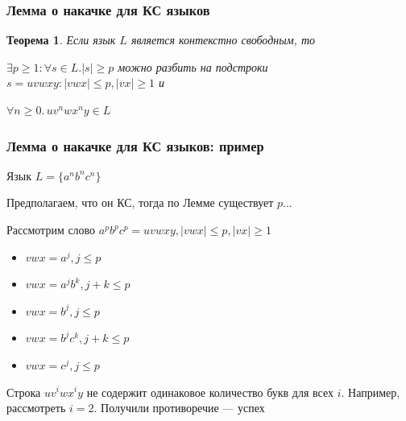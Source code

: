 \documentclass{beamer}
\newtheorem{rutheorem}{Теорема}
\begin{document}
\begin{frame}[fragile]
  \transwipe[direction=90]
  \frametitle{Лемма о накачке для КС языков}
  \begin{rutheorem}
    Если язык $L$ является контекстно свободным, то 
    
    $\exists p \geq 1: \forall s \in L. |s| \geq p $ можно разбить на подстроки $s = uvwxy: |vwx| \leq p, |vx| \geq 1$ и
    
     $\forall n \geq 0. \, u v^n w x^n y \in L$
  \end{rutheorem}
\end{frame}

\begin{frame}[fragile]
  \transwipe[direction=90]
  \frametitle{Лемма о накачке для КС языков: пример}
  Язык $L = \{ a^n b^n c^n \}$
  
  Предполагаем, что он КС, тогда по Лемме существует $p$... 
  
  Рассмотрим слово $a^p b^p c^p = uvwxy, |vwx| \leq p, |vx| \geq 1 $
  
  \begin{itemize}
    \item $vwx = a^j, j \leq p$
    \item $vwx = a^j b^k, j + k \leq p$
    \item $vwx = b^j, j \leq p$
    \item $vwx = b^j c^k, j + k \leq p$
    \item $vwx = c^j, j \leq p$
  \end{itemize}   
  
  Строка $u v^i w x^i y $ не содержит одинаковое количество букв для всех $i$. Например, рассмотреть $i = 2$. Получили противоречие --- успех
\end{frame}
\end{document}
